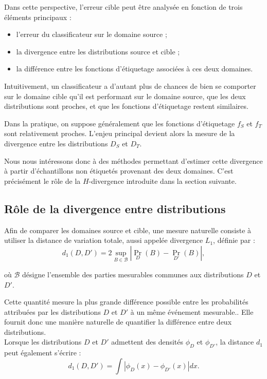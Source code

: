\documentclass[a4paper,12pt]{article}
\theoremstyle{definition}
\theoremstyle{remark}
\begin{document}
Dans cette perspective, l’erreur cible peut être analysée en fonction de trois éléments
principaux :
\begin{itemize}
\item l’erreur du classificateur sur le domaine source ;
\item la divergence entre les distributions source et cible ;
\item la différence entre les fonctions d’étiquetage associées à ces deux domaines.
\end{itemize}

Intuitivement, un classificateur a d’autant plus de chances de bien se comporter sur
le domaine cible qu’il est performant sur le domaine source, que les deux distributions
sont proches, et que les fonctions d’étiquetage restent similaires.

Dans la pratique, on suppose généralement que les fonctions d’étiquetage $f_S$ et $f_T$
sont relativement proches. L’enjeu principal devient alors la mesure de la divergence entre
les distributions $D_S$ et $D_T$.

Nous nous intéressons donc à des méthodes permettant d’estimer cette divergence à partir
d’échantillons non étiquetés provenant des deux domaines. C’est précisément le rôle de la
$H$-divergence introduite dans la section suivante.

\subsection{Rôle de la divergence entre distributions}

Afin de comparer les domaines source et cible, une mesure naturelle consiste à utiliser la distance de variation totale, aussi appelée divergence $L_1$, définie par : 
\[
d_1(D, D') = 2 \sup_{B \in \mathcal{B}} \left| \Pr_D(B) - \Pr_{D'}(B) \right|,
\]

où $\mathcal{B}$ désigne l’ensemble des parties mesurables communes aux distributions $D$ et $D'$.

Cette quantité mesure la plus grande différence possible entre les probabilités attribuées par les distributions $D$ et $D'$ à un même événement mesurable.. Elle fournit donc une manière naturelle de quantifier la différence entre deux distributions.\\ 

Lorsque les distributions $D$ et $D'$ admettent des densités
$\phi_D$ et $\phi_{D'}$, la distance $d_1$ peut également s’écrire :
\[
d_1(D,D')
=
\int |\phi_D(x)-\phi_{D'}(x)|dx.
\]
\end{document}
